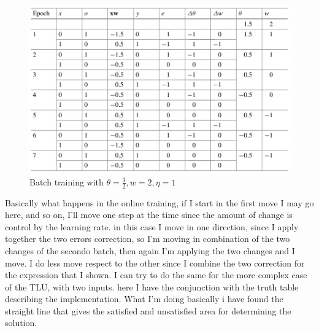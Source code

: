 \documentclass{article}
\begin{document}
\begin{figure}[H]
    \centering
    \includegraphics[scale=0.5]{images/batch_training.png}
    \caption{Batch training with $\theta = \frac{3}{2},w=2,\eta = 1$}
\end{figure}
Basically what happens in the online training, if I start in the first move I may go here,
and so on, I'll move one step at the time since the amount of change is control by the
learning rate.
\newline\newline
in this case I move in one direction, since I apply together the two errors correction,
so I'm moving in combination of the two changes of the secondo batch, then again I'm applying
the two changes and I move. I do less move respect to the other since  I combine the two
correction for the expression that I shown.
\newline\newline
I can try to do the same for the more complex case of the TLU, with two inputs. here I have
the conjunction with the truth table describing the implementation. What I'm doing basically
i have found the straight line that gives the satisfied and unsatisfied area for determining
the solution.
\end{document}
